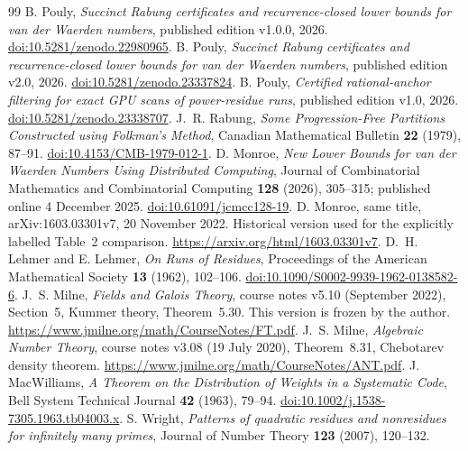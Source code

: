 \documentclass[11pt]{article}
\theoremstyle{definition}\newtheorem{definition}[theorem]{Definition}
\begin{document}
\begin{thebibliography}{99}
B. Pouly, \emph{Succinct Rabung certificates and recurrence-closed lower
bounds for van der Waerden numbers}, published edition v1.0.0, 2026.
\href{https://doi.org/10.5281/zenodo.22980965}{doi:10.5281/zenodo.22980965}.
B. Pouly, \emph{Succinct Rabung certificates and recurrence-closed lower
bounds for van der Waerden numbers}, published edition v2.0, 2026.
\href{https://doi.org/10.5281/zenodo.23337824}{doi:10.5281/zenodo.23337824}.
B. Pouly, \emph{Certified rational-anchor filtering for exact GPU scans
of power-residue runs}, published edition v1.0, 2026.
\href{https://doi.org/10.5281/zenodo.23338707}{doi:10.5281/zenodo.23338707}.
 J.~R. Rabung,
\emph{Some Progression-Free Partitions Constructed using Folkman's Method},
Canadian Mathematical Bulletin \textbf{22} (1979), 87--91.
\href{https://doi.org/10.4153/CMB-1979-012-1}{doi:10.4153/CMB-1979-012-1}.
 D. Monroe,
\emph{New Lower Bounds for van der Waerden Numbers Using Distributed Computing},
Journal of Combinatorial Mathematics and Combinatorial Computing
\textbf{128} (2026), 305--315; published online 4 December 2025.
\href{https://doi.org/10.61091/jcmcc128-19}{doi:10.61091/jcmcc128-19}.
 D. Monroe, same title,
arXiv:1603.03301v7, 20 November 2022.
Historical version used for the explicitly labelled Table~2 comparison.
\url{https://arxiv.org/html/1603.03301v7}.
 D.~H. Lehmer and E. Lehmer,
\emph{On Runs of Residues}, Proceedings of the American Mathematical Society
\textbf{13} (1962), 102--106.
\href{https://doi.org/10.1090/S0002-9939-1962-0138582-6}{doi:10.1090/S0002-9939-1962-0138582-6}.
 J.~S. Milne, \emph{Fields and Galois Theory},
course notes v5.10 (September 2022), Section~5,
Kummer theory, Theorem~5.30. This version is frozen by the author.
\url{https://www.jmilne.org/math/CourseNotes/FT.pdf}.
 J.~S. Milne, \emph{Algebraic Number Theory},
course notes v3.08 (19 July 2020), Theorem~8.31,
Chebotarev density theorem.
\url{https://www.jmilne.org/math/CourseNotes/ANT.pdf}.
 J. MacWilliams,
\emph{A Theorem on the Distribution of Weights in a Systematic Code},
Bell System Technical Journal \textbf{42} (1963), 79--94.
\href{https://doi.org/10.1002/j.1538-7305.1963.tb04003.x}{doi:10.1002/j.1538-7305.1963.tb04003.x}.
 S. Wright,
\emph{Patterns of quadratic residues and nonresidues for infinitely many primes},
Journal of Number Theory \textbf{123} (2007), 120--132.

\end{thebibliography}
\end{document}
